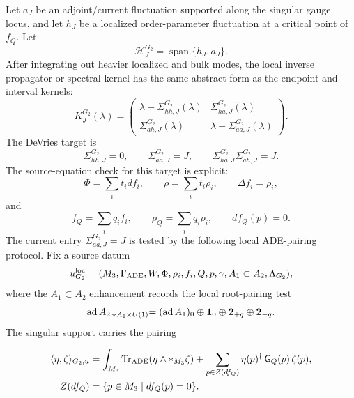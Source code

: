 Let \(a_J\) be an adjoint/current fluctuation supported along the singular gauge locus, and let \(h_J\) be a localized order-parameter fluctuation at a critical point of \(f_Q\).  Let
\begin{equation}
  \mathcal H_J^{G_2}=\operatorname{span}\{h_J,a_J\}.
  \label{eq:g2-light-sector}
\end{equation}
After integrating out heavier localized and bulk modes, the local inverse propagator or spectral kernel has the same abstract form as the endpoint and interval kernels:
\begin{equation}
  K_J^{G_2}(\lambda)=
  \begin{pmatrix}
  \lambda+\Sigma_{hh,J}^{G_2}(\lambda)
  &
  \Sigma_{ha,J}^{G_2}(\lambda)
  \\
  \Sigma_{ah,J}^{G_2}(\lambda)
  &
  \lambda+\Sigma_{aa,J}^{G_2}(\lambda)
  \end{pmatrix}.
  \label{eq:g2-local-kernel}
\end{equation}
The DeVries target is
\begin{equation}
  \Sigma_{hh,J}^{G_2}=0,\qquad
  \Sigma_{aa,J}^{G_2}=J,\qquad
  \Sigma_{ha,J}^{G_2}\Sigma_{ah,J}^{G_2}=J.
  \label{eq:g2-self-energy-target}
\end{equation}
The source-equation check for this target is explicit:
\begin{equation}
  \Phi=\sum_i t_i df_i,\qquad
  \rho=\sum_i t_i\rho_i,\qquad
  \Delta f_i=\rho_i,
  \label{eq:g2-source-equation-one}
\end{equation}
and
\begin{equation}
  f_Q=\sum_i q_i f_i,\qquad
  \rho_Q=\sum_i q_i\rho_i,\qquad
  df_Q(p)=0.
  \label{eq:g2-source-equation-two}
\end{equation}
The current entry \(\Sigma_{aa,J}^{G_2}=J\) is tested by the following local
ADE-pairing protocol.  Fix a source datum
\begin{equation}
  u_{G_2}^{\rm loc}
  =
  (M_3,\Gamma_{\rm ADE},W,\Phi,\rho_i,f_i,Q,p,\gamma,
  A_1\subset A_2,\Lambda_{G_2}),
  \label{eq:g2-local-source-datum}
\end{equation}
where the \(A_1\subset A_2\) enhancement records the local root-pairing test
\begin{equation}
  \operatorname{ad} A_2\!\downarrow_{A_1\times U(1)}
  =
  (\operatorname{ad} A_1)_0
  \oplus {\bf 1}_0
  \oplus {\bf 2}_{+q}
  \oplus {\bf 2}_{-q}.
  \label{eq:g2-a1-a2-enhancement-test}
\end{equation}
The singular support carries the pairing
\begin{widetext}
\begin{equation}
  \begin{aligned}
  \langle \eta,\zeta\rangle_{G_2,u}
  &=
  \int_{M_3}
  {\rm Tr}_{\rm ADE}\!\left(\eta\wedge *_{M_3}\zeta\right)
  +
  \sum_{p\in Z(df_Q)}
  \eta(p)^\dagger\,\mathsf G_Q(p)\,\zeta(p),
  \\
  Z(df_Q)&=\{p\in M_3\mid df_Q(p)=0\}.
  \end{aligned}
  \label{eq:g2-singular-support-pairing}
\end{equation}
\end{widetext}

